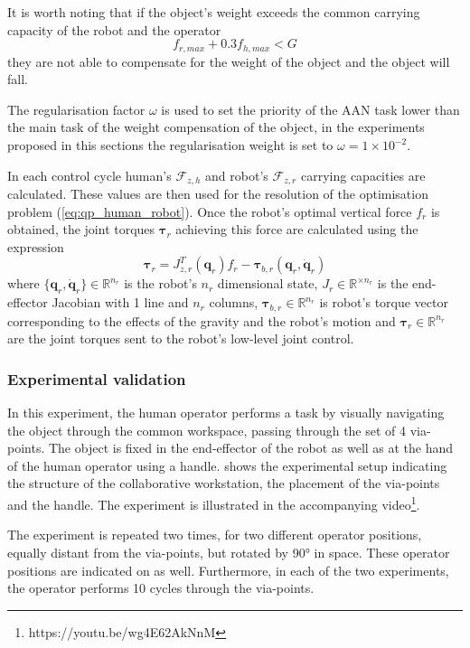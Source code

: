 It is worth noting that if the object's weight exceeds the common carrying capacity of the robot and the operator $$f_{r,max} + 0.3f_{h,max} < G$$
they are not able to compensate for the weight of the object and the object will fall. 

The regularisation factor $\omega$ is used to set the priority of the AAN task lower than the main task of the weight compensation of the object, in the experiments proposed in this sections the regularisation weight is set to $\omega=1\times 10^{-2}$.

In each control cycle human's $\mathcal{F}_{z,h}$ and robot's $\mathcal{F}_{z,r}$ carrying capacities are calculated. These values are then used for the resolution of the optimisation problem (\ref{eq:qp_human_robot}). Once the robot's optimal vertical force $f_{r}$ is obtained, the joint torques $\bm{\tau}_{r}$ achieving this force are calculated using the expression
$$
\bm{\tau}_r = J_{z,r}^T(\bm{q}_r) f_r - \bm{\tau}_{b,r}(\bm{q}_r,\dot{\bm{q}}_r)
$$
where $\{\bm{q}_r,\dot{\bm{q}}_r\}\in \mathbb{R}^{n_r}$ is the robot's $n_r$ dimensional state, $J_r\in\mathbb{R}^{\times n_r}$ is the end-effector Jacobian with 1 line and $n_r$ columns, $\bm{\tau}_{b,r} \in\mathbb{R}^{n_r}$ is robot's torque vector corresponding to the effects of the gravity and the robot's motion and $\bm{\tau}_r \in\mathbb{R}^{n_r}$ are the joint torques sent to the robot's low-level joint control. 

\subsubsection{Experimental validation}
\label{sec:human_robot_experiment}

In this experiment, the human operator performs a task by {visually} navigating the object through the common workspace, passing through {the set of} 4 via-points. The object is fixed in the end-effector of the robot as well as at the hand of the human operator using a handle.  shows the experimental setup indicating the structure of the collaborative workstation, the placement of the via-points and the handle. 
The experiment is illustrated in the accompanying video\footnote{https://youtu.be/wg4E62AkNnM}.



The experiment is repeated two times, for two different operator positions, equally distant from the via-points, but rotated by 90° in space. These operator positions are indicated on  as well. Furthermore, in each of the two experiments, the operator performs 10 cycles through the via-points.


